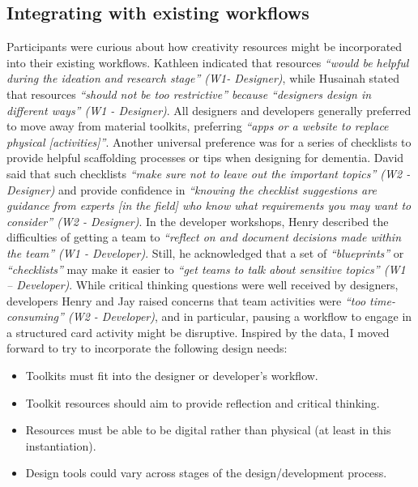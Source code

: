 \subsection{Integrating with existing workflows}
Participants were curious about how creativity resources might be incorporated into their existing workflows. Kathleen indicated that resources \textit{``would be helpful during the ideation and research stage'' (W1- Designer)}, while Husainah stated that resources \textit{``should not be too restrictive'' because ``designers design in different ways'' (W1 - Designer)}. All designers and developers generally preferred to move away from material toolkits, preferring \textit{``apps or a website to replace physical [activities]''}. 
Another universal preference was for a series of checklists to provide helpful scaffolding processes or tips when designing for dementia. David said that such checklists \textit{``make sure not to leave out the important topics'' (W2 - Designer)} and provide confidence in \textit{``knowing the checklist suggestions are guidance from experts [in the field] who know what requirements you may want to consider'' (W2 - Designer)}. In the developer workshops, Henry described the difficulties of getting a team to \textit{``reflect on and document decisions made within the team'' (W1 - Developer)}. Still, he acknowledged that a set of \textit{``blueprints''} or \textit{``checklists''} may make it easier to \textit{``get teams to talk about sensitive topics'' (W1 – Developer)}. 
While critical thinking questions were well received by designers, developers Henry and Jay raised concerns that team activities were \textit{``too time-consuming'' (W2 - Developer)}, and in particular, pausing a workflow to engage in a structured card activity might be disruptive. Inspired by the data, I moved forward to try to incorporate the following design needs:
\begin{itemize}
\item Toolkits must fit into the designer or developer’s workflow.	
\item Toolkit resources should aim to provide reflection and critical thinking.
\item Resources must be able to be digital rather than physical (at least in this instantiation).
\item Design tools could vary across stages of the design/development process.
\end{itemize}

